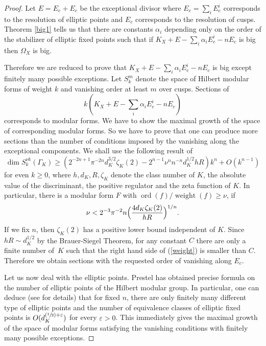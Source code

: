 \documentclass[JEP,XML,SOM,Unicode]{cedram}
\let\epsilon\varepsilon
\newcommand{\Psfrac}[2]{(\sfrac{#1}{#2})}
\theoremstyle{plain}
\theoremstyle{definition}
\numberwithin{equation}{theorem}
\DeclareMathOperator{\ord}{ord}
\DeclareMathOperator{\weight}{weight}
\begin{document}
\begin{proof}
Let $E=E_e+E_c$ be the exceptional divisor where $E_e=\sum_i E_e^i$ corresponds to the resolution of elliptic points and $E_c$ corresponds to the resolution of cusps. Theorem \ref{big1} tells us that there are constants $\alpha_i$ depending only on the order of the stabilizer of elliptic fixed points such that if $K_X+E-\sum_i \alpha_i E_e^i - nE_c$ is big then $\Omega_X$ is big.

Therefore we are reduced to prove that $K_X+E-\sum_i \alpha_i E_e^i - nE_c$ is big except finitely many possible exceptions. Let $S_k^m$ denote the space of Hilbert modular forms of weight $k$ and vanishing order at least $m$ over cusps. Sections of $$\textstyle k(K_X+E-\sum_i \alpha_i E_e^i - nE_c)$$ corresponds to modular forms. We have to show the maximal growth of the space of corresponding modular forms.
So we have to prove that one can produce more sections than the number of conditions imposed by the vanishing along the exceptional components.
We shall use the following result of \cite[\S4]{Tsu85}
\begin{equation}\label{RR}
\dim S_k^{\nu k}(\Gamma_K) \geq (2^{-2n+1}\pi^{-2n} d_K^{3/2} \zeta_K(2)-2^{n-1}\nu^nn^{-n}d_K^{1/2}hR)k^n+O(k^{n-1})
\end{equation}
for even $k \geq 0$, where $h, d_K, R, \zeta_K$ denote the class number of $K$, the absolute value of the discriminant, the positive regulator and the zeta function of $K$.
In particular, there is a modular form $F$ with $\ord (f)/\weight(f) \geq \nu$, if
\begin{equation}\label{weight}
\nu < 2^{-3}\pi^{-2}n\Bigl( \frac{4d_K\zeta_K(2)}{hR}\Bigr)^{1/n}.
\end{equation}
If we fix $n$, then $\zeta_K(2)$ has a positive lower bound independent of $K$. Since $hR \sim d_K^{1/2}$ by the Brauer-Siegel Theorem, for any constant $C$ there are only a finite number of~$K$ such that the right hand side of (\ref{weight}) is smaller than $C$.
Therefore we obtain sections with the requested order of vanishing along $E_c$.

Let us now deal with the elliptic points.
Prestel \cite{Prestel} has obtained precise formula on the number of elliptic points of the Hilbert modular group.
In particular, one can deduce (see \cite[\S6.5]{RT} for details) that for fixed $n$, there are only finitely many different type of elliptic points and the number of equivalence classes of elliptic fixed points is $O(d_K^{\Psfrac{1}{2}+\epsilon})$ for every $\epsilon>0$.
This immediately gives the maximal growth of the space of modular forms satisfying the vanishing conditions with finitely many possible exceptions.
\end{proof}
\end{document}
